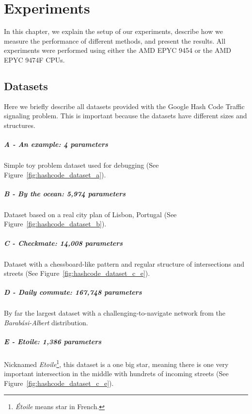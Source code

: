\chapter{Experiments} \label{chap:experiments}

In this chapter, we explain the setup of our experiments, describe how we measure the performance of different methods, and present the results. All experiments were performed using either the AMD EPYC 9454 or the AMD EPYC 9474F CPUs.

\section{Datasets}

Here we briefly describe all datasets provided with the Google Hash Code Traffic signaling problem. This is important because the datasets have different sizes and structures.

\paragraph{A - An example: 4 parameters} Simple toy problem dataset used for debugging (See Figure~\ref{fig:hashcode_dataset_a}).

\paragraph{B - By the ocean: 5,974 parameters} Dataset based on a real city plan of Lisbon, Portugal (See Figure~\ref{fig:hashcode_dataset_b}).

\paragraph{C - Checkmate: 14,008 parameters} Dataset with a chessboard-like pattern and regular structure of intersections and streets (See Figure~\ref{fig:hashcode_dataset_c_e}).

\paragraph{D - Daily commute: 167,748 parameters} By far the largest dataset with a challenging-to-navigate network from the \textit{Barabási-Albert} distribution.

\paragraph{E - Etoile: 1,386 parameters} Nicknamed \textit{Etoile}\footnote{\textit{Étoile} means star in French.}, this dataset is a one big star, meaning there is one very important intersection in the middle with hundrets of incoming streets (See Figure~\ref{fig:hashcode_dataset_c_e}).

